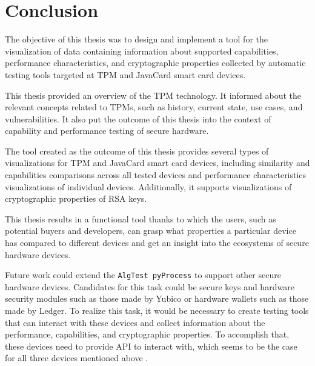 \chapter{Conclusion}
The objective of this thesis was to design and implement a tool for the visualization of data containing information about supported capabilities, performance characteristics, and cryptographic properties collected by automatic testing tools targeted at TPM and JavaCard smart card devices. 

This thesis provided an overview of the TPM technology. It informed about the relevant concepts related to TPMs, such as history, current state, use cases, and vulnerabilities. It also put the outcome of this thesis into the context of capability and performance testing of secure hardware.

The tool created as the outcome of this thesis provides several types of visualizations for TPM and JavaCard smart card devices, including similarity and capabilities comparisons across all tested devices and performance characteristics visualizations of individual devices. Additionally, it supports visualizations of cryptographic properties of RSA keys.

This thesis results in a functional tool thanks to which the users, such as potential buyers and developers, can grasp what properties a particular device has compared to different devices and get an insight into the ecosystems of secure hardware devices.

Future work could extend the \texttt{AlgTest pyProcess} to support other secure hardware devices. Candidates for this task could be secure keys and hardware security modules such as those made by Yubico or hardware wallets such as those made by Ledger. To realize this task, it would be necessary to create testing tools that can interact with these devices and collect information about the performance, capabilities, and cryptographic properties. To accomplish that, these devices need to provide API to interact with, which seems to be the case for all three devices mentioned above \cite{yubicoDEV, ledgerDEV}.